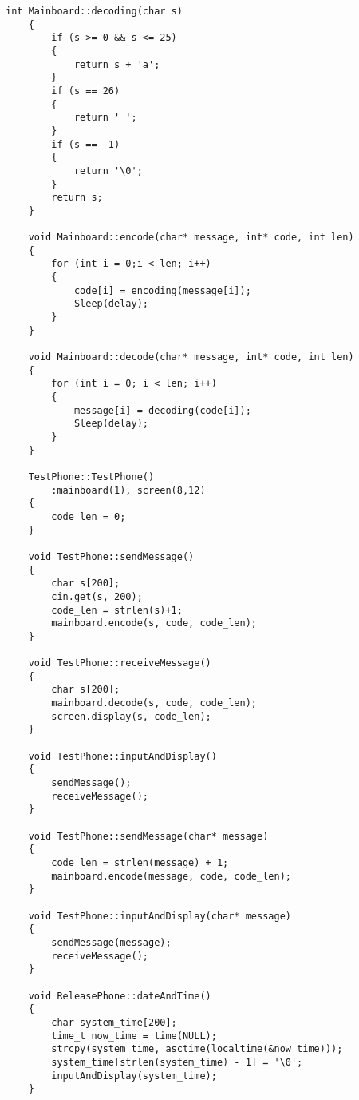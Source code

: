 \documentclass[UTF8]{ctexart}
\begin{document}
\begin{lstlisting}[language={[ANSI]C++}]
    int Mainboard::decoding(char s)
    {
        if (s >= 0 && s <= 25)
        {
            return s + 'a';
        }
        if (s == 26)
        {
            return ' ';
        }
        if (s == -1)
        {
            return '\0';
        }
        return s;
    }
    
    void Mainboard::encode(char* message, int* code, int len)
    {
        for (int i = 0;i < len; i++)
        {
            code[i] = encoding(message[i]);
            Sleep(delay);
        }
    }
    
    void Mainboard::decode(char* message, int* code, int len)
    {
        for (int i = 0; i < len; i++)
        {
            message[i] = decoding(code[i]);
            Sleep(delay);
        }
    }
    
    TestPhone::TestPhone()
        :mainboard(1), screen(8,12)
    {
        code_len = 0;
    }
    
    void TestPhone::sendMessage()
    {
        char s[200];
        cin.get(s, 200);
        code_len = strlen(s)+1;
        mainboard.encode(s, code, code_len);
    }
    
    void TestPhone::receiveMessage()
    {
        char s[200];
        mainboard.decode(s, code, code_len);
        screen.display(s, code_len);
    }
    
    void TestPhone::inputAndDisplay()
    {
        sendMessage();
        receiveMessage();
    }
    
    void TestPhone::sendMessage(char* message)
    {
        code_len = strlen(message) + 1;
        mainboard.encode(message, code, code_len);
    }
    
    void TestPhone::inputAndDisplay(char* message)
    {
        sendMessage(message);
        receiveMessage();
    }
    
    void ReleasePhone::dateAndTime()
    {
        char system_time[200];
        time_t now_time = time(NULL);
        strcpy(system_time, asctime(localtime(&now_time)));
        system_time[strlen(system_time) - 1] = '\0';
        inputAndDisplay(system_time);
    }
\end{lstlisting}
\end{document}
